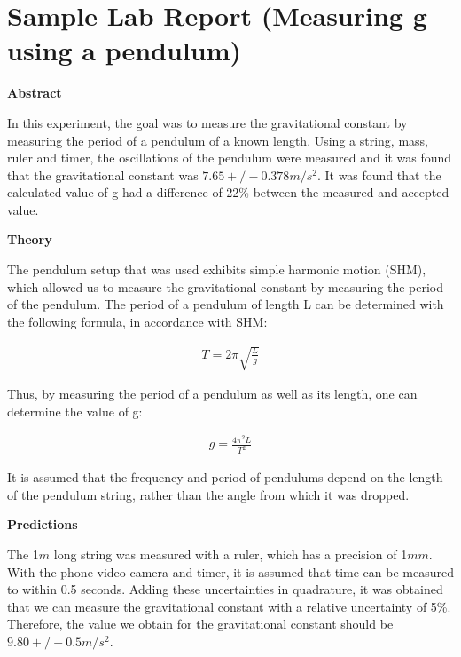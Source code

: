  \vspace{0.25cm}
\section{Sample Lab Report (Measuring g using a pendulum)}
 \vspace{0.25cm}
\textbf{Abstract}

In this experiment, the goal was to measure the gravitational constant by measuring the period of a pendulum of a known length. Using a string, mass, ruler and timer, the oscillations of the pendulum were measured and it was found that the gravitational constant was $\SI{7.65}+/- {0.378}{m/s^2}$. It was found that the calculated value of g had a difference of 22\% between the measured and accepted value.

\textbf{Theory}

The pendulum setup that was used exhibits simple harmonic motion (SHM), which allowed us to measure the gravitational constant by measuring the period of the pendulum. The period of a pendulum of length L can be determined with the following formula, in accordance with SHM:

\begin{align*}
T=2\pi \sqrt {\frac{L}{g}}
\end{align*}

Thus, by measuring the period of a pendulum as well as its length, one can determine the value of g:

\begin{align*}
g=\frac{4\pi^{2}L}{T^{2}}
\end{align*}

It is assumed that the frequency and period of pendulums depend on the length of the pendulum string, rather than the angle from which it was dropped. 

\textbf{Predictions}

The 1$\si{m}$ long string was measured with a ruler, which has a precision of 1$\si{mm}$. With the phone video camera and timer, it is assumed that time can be measured to within 0.5 seconds. Adding these uncertainties in quadrature, it was obtained that we can measure the gravitational constant with a relative uncertainty of 5\%. Therefore, the value we obtain for the gravitational constant should be $\SI{9.80}+/- {0.5}{m/s^2}$. 


